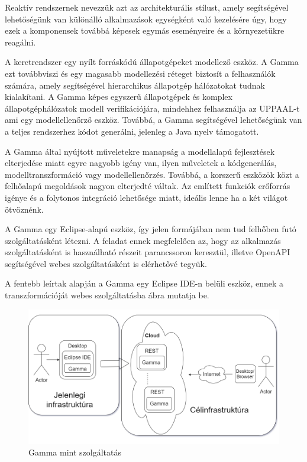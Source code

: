 Reaktív rendszernek nevezzük azt az architekturális stílust, amely segítségével lehetőségünk van különálló alkalmazások egységként való kezelésére úgy, hogy ezek a komponensek továbbá képesek egymás eseményeire és a környezetükre reagálni.

A keretrendszer egy nyílt forráskódú állapotgépeket modellező eszköz. A Gamma ezt továbbviszi és egy magasabb modellezési réteget biztosít a felhasználók számára, amely segítségével hierarchikus állapotgép hálózatokat tudnak kialakítani. A Gamma képes egyszerű állapotgépek és komplex állapotgéphálózatok modell verifikációjára, mindehhez felhasználja az UPPAAL-t ami egy modellellenőrző eszköz. Továbbá, a Gamma segítségével lehetőségünk van a teljes rendszerhez kódot generálni, jelenleg a Java nyelv támogatott.


A Gamma által nyújtott műveletekre manapság a modellalapú fejlesztések elterjedése miatt egyre nagyobb igény van, ilyen műveletek a kódgenerálás, modelltranszformáció vagy modellellenőrzés. Továbbá, a korszerű eszközök közt a felhőalapú megoldások nagyon elterjedté váltak. Az említett funkciók erőforrás igénye és a folytonos integráció lehetősége miatt, ideális lenne ha a két világot ötvöznénk.


A Gamma egy Eclipse-alapú eszköz, így jelen formájában nem tud felhőben futó szolgáltatásként létezni. A feladat ennek megfelelően az, hogy az alkalmazás szolgáltatásként is használható részeit parancssoron keresztül, illetve OpenAPI segítségével webes szolgáltatásként is elérhetővé tegyük.

A fentebb leírtak alapján a Gamma egy Eclipse IDE-n belüli eszköz, ennek a transzformációját webes szolgáltatásba  ábra mutatja be.

\begin{figure}[t]
	\centering
	\includegraphics[width=150mm, keepaspectratio]{figures/transformation.png}
	\caption{Gamma mint szolgáltatás}
	\label{fig:transformation}
\end{figure}


